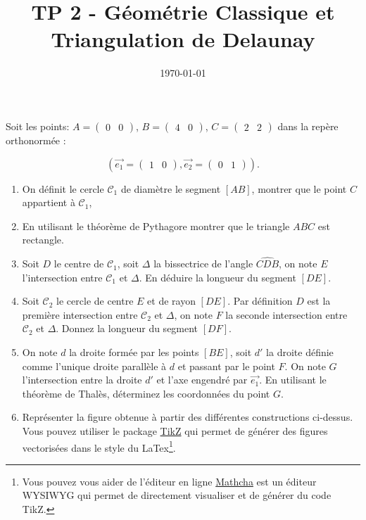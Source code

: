 \documentclass[a4paper,12pt]{article}
\title{TP 2 - Géométrie Classique et Triangulation de Delaunay}
\author{}
\date{\today}
\begin{document}
\makeonlytitle

\label{exo:theorique}

Soit les points: $A=\begin{pmatrix}0 & 0\end{pmatrix}$, $B=\begin{pmatrix}4 & 0\end{pmatrix}$, $C=\begin{pmatrix}2 & 2\end{pmatrix}$ dans la repère orthonormée :

\begin{equation*}
\left(\vec{e_1} = \begin{pmatrix}1 & 0\end{pmatrix}, \vec{e_2} = \begin{pmatrix}0 & 1\end{pmatrix}\right).
\end{equation*}

\begin{enumerate}
  \item On définit le cercle $\mathcal{C}_1$ de diamètre le segment $[AB]$, montrer que le point $C$ appartient à $\mathcal{C}_1$, 
  \item En utilisant le théorème de Pythagore montrer que le triangle $ABC$ est rectangle.
  \item Soit $D$ le centre de $\mathcal{C}_1$, soit $\Delta$ la bissectrice de l'angle $\widehat{CDB}$, on note $E$ l'intersection entre $\mathcal{C}_1$ et $\Delta$. En déduire la longueur du segment $[DE]$. 
  \item Soit $\mathcal{C}_2$ le cercle de centre $E$ et de rayon $[DE]$. Par définition $D$ est la première intersection entre $\mathcal{C}_2$ et $\Delta$, on note $F$ la seconde intersection entre $\mathcal{C}_2$ et $\Delta$. Donnez la longueur du segment $[DF]$.
  \item On note $d$ la droite formée par les points $[BE]$, soit $d'$ la droite définie comme l'unique droite parallèle à $d$ et passant par le point $F$. On note $G$ l'intersection entre la droite $d'$ et l'axe engendré par $\vec{e_1}$. En utilisant le théorème de Thalès, déterminez les coordonnées du point $G$.
  \item Représenter la figure obtenue à partir des différentes constructions ci-dessus. Vous pouvez utiliser le package \href{https://www.overleaf.com/learn/latex/TikZ_package}{TikZ} qui permet de générer des figures vectorisées dans le style du LaTex\footnote{Vous pouvez vous aider de l'éditeur en ligne \href{https://www.mathcha.io/}{Mathcha} est un éditeur WYSIWYG qui permet de directement visualiser et de générer du code TikZ.}.  
\end{enumerate}
\end{document}
